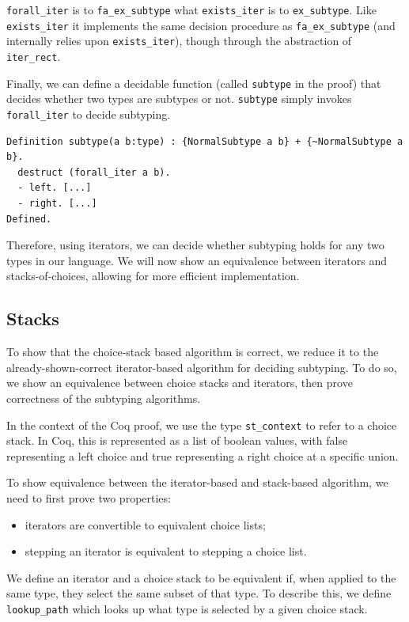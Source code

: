 \documentclass[a4paper,english]{lipics-v2018}
\begin{document}
\verb|forall_iter| is to \verb|fa_ex_subtype| what \verb|exists_iter| is to
\verb|ex_subtype|. Like \verb|exists_iter| it implements the same decision procedure
as \verb|fa_ex_subtype| (and internally relies upon \verb|exists_iter|), though through
the abstraction of \verb|iter_rect|.

Finally, we can define a decidable function (called \verb|subtype| in the proof)
that decides whether two types are subtypes or not. \verb|subtype| simply invokes
\verb|forall_iter| to decide subtyping.

\begin{small}\begin{verbatim}
Definition subtype(a b:type) : {NormalSubtype a b} + {~NormalSubtype a b}.
  destruct (forall_iter a b).
  - left. [...]
  - right. [...]
Defined.
\end{verbatim}\end{small}

\noindent Therefore, using iterators, we can decide whether subtyping holds for any two types
in our language. We will now show an equivalence between iterators and stacks-of-choices,
allowing for more efficient implementation.

\subsection{Stacks}

To show that the choice-stack based algorithm is correct, we reduce it to the
already-shown-correct iterator-based algorithm for deciding subtyping. To do so,
we show an equivalence between choice stacks and iterators, then prove correctness
of the subtyping algorithms.

In the context of the Coq proof, we use the type \verb|st_context| to refer
to a choice stack. In Coq, this is represented as a list of boolean values,
with false representing a left choice and true representing a right choice at
a specific union.

To show equivalence between the iterator-based and stack-based algorithm, we need to
first prove two properties:

\begin{itemize}
  \item iterators are convertible to equivalent choice lists;
  \item stepping an iterator is equivalent to stepping a choice list.
\end{itemize}

We define an iterator and a choice stack to be equivalent if, when applied to
the same type, they select the same subset of that type. To describe this, we
define \verb|lookup_path| which looks up what type is selected by a given
choice stack.
\end{document}
